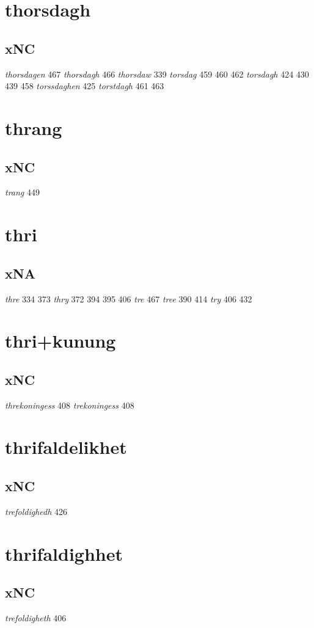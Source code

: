 \documentclass[a4paper,twocolumn]{article}
\begin{document}
\section{thorsdagh}
\label{sec:org863bcd3}
\subsection{xNC}
\label{sec:orgc5d5894}
\emph{thorsdagen} 467 \emph{thorsdagh} 466 \emph{thorsdaw} 339 \emph{torsdag} 459 460 462 \emph{torsdagh} 424 430 439 458 \emph{torssdaghen} 425 \emph{torstdagh} 461 463 
\section{thrang}
\label{sec:orge870894}
\subsection{xNC}
\label{sec:org47f2bcd}
\emph{trang} 449 
\section{thri}
\label{sec:org32b63fc}
\subsection{xNA}
\label{sec:org575e393}
\emph{thre} 334 373 \emph{thry} 372 394 395 406 \emph{tre} 467 \emph{tree} 390 414 \emph{try} 406 432 
\section{thri+kunung}
\label{sec:org125c603}
\subsection{xNC}
\label{sec:org7398006}
\emph{threkoningess} 408 \emph{trekoningess} 408 
\section{thrifaldelikhet}
\label{sec:orgbe88179}
\subsection{xNC}
\label{sec:org76c973d}
\emph{trefoldighedh} 426 
\section{thrifaldighhet}
\label{sec:org9eb2edf}
\subsection{xNC}
\label{sec:org505fbaf}
\emph{trefoldigheth} 406 
\end{document}
